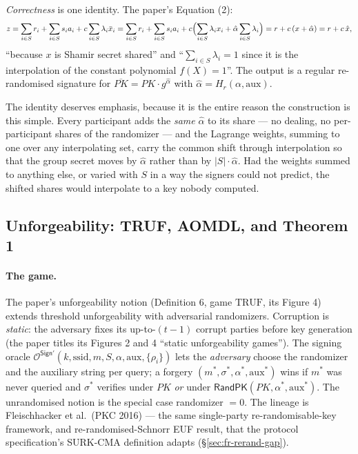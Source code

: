 \documentclass[11pt,a4paper]{article}
\theoremstyle{definition}
\begin{document}
\emph{Correctness} is one identity. The paper's Equation (2):
\begin{equation}\label{eq:fr-rerand-z}
z = \sum_{i \in S} r_i + \sum_{i \in S} s_i a_i
    + c \sum_{i \in S} \lambda_i \bar{x}_i
  = \sum_{i \in S} r_i + \sum_{i \in S} s_i a_i
    + c \Bigl( \sum_{i \in S} \lambda_i x_i
    + \hat{\alpha} \sum_{i \in S} \lambda_i \Bigr)
  = r + c\,(x + \hat{\alpha}) = r + c\,\hat{x},
\end{equation}
``because $x$ is Shamir secret shared'' and
``$\sum_{i \in S} \lambda_i = 1$ since it is the interpolation of the
constant polynomial $f(X) = 1$''. The output is a regular re-randomised
signature for $\overline{PK} = PK \cdot g^{\hat{\alpha}}$ with
$\hat{\alpha} = H_r(\alpha, \mathrm{aux})$.

The identity deserves emphasis, because it is the entire reason the
construction is this simple. Every participant adds the \emph{same}
$\hat{\alpha}$ to its share --- no dealing, no per-participant shares of
the randomizer --- and the Lagrange weights, summing to one over any
interpolating set, carry the common shift through interpolation so that
the group secret moves by $\hat{\alpha}$ rather than by
$|S| \cdot \hat{\alpha}$. Had the weights summed to anything else, or
varied with $S$ in a way the signers could not predict, the shifted
shares would interpolate to a key nobody computed.

\subsection{Unforgeability: TRUF, AOMDL, and Theorem 1}
\label{sec:fr-rerand-sec}

\paragraph{The game.} The paper's unforgeability notion (Definition 6,
game $\mathrm{TRUF}$, its Figure 4) extends threshold unforgeability with
adversarial randomizers. Corruption is \emph{static}: the adversary fixes
its up-to-$(t-1)$ corrupt parties before key generation (the paper titles
its Figures 2 and 4 ``static unforgeability games''). The signing oracle
$\mathcal{O}^{\mathsf{Sign}'}(k, \mathrm{ssid}, m, S, \alpha,
\mathrm{aux}, \{\rho_i\})$ lets the \emph{adversary} choose the
randomizer and the auxiliary string per query; a forgery
$(m^*, \sigma^*, \alpha^*, \mathrm{aux}^*)$ wins if $m^*$ was never
queried and $\sigma^*$ verifies under $PK$ \emph{or} under
$\mathsf{RandPK}(PK, \alpha^*, \mathrm{aux}^*)$. The unrandomised notion
is the special case randomizer $= 0$. The lineage is Fleischhacker et
al.\ (PKC 2016) --- the same single-party re-randomisable-key framework,
and re-randomised-Schnorr EUF result, that the protocol specification's
SURK-CMA definition adapts (\S\ref{sec:fr-rerand-gap}).
\end{document}
